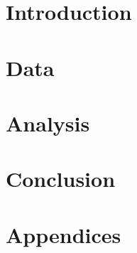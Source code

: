 \documentclass[11pt]{article}
\begin{document}
\newpage

\section{Introduction}

\section{Data}

\section{Analysis}

\section{Conclusion}

\section{Appendices}
\end{document}
